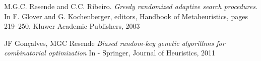 \begin{thebibliography}{9}

M.G.C. Resende and C.C. Ribeiro. 
\textit{Greedy randomized adaptive search procedures}. 
In F. Glover and G. Kochenberger, editors, Handbook of Metaheuristics, pages 219–250. Kluwer Academic Publishers, 2003


JF Gonçalves, MGC Resende
\textit{Biased random-key genetic algorithms for combinatorial optimization}
In - Springer, Journal of Heuristics, 2011 

  

 
\end{thebibliography}